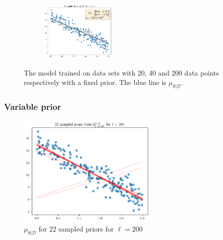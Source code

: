 \begin{figure}[H]
\begin{subfigure}{1\textwidth}
  \centering
  \includegraphics[width=0.4\textwidth]{assets/week1/fixed-prior-200-samples.png}
\end{subfigure}%
\caption{The model trained on data sets with 20, 40 and 200 data points respectively with a fixed prior. The blue line is $\mu_{\theta|\mathcal{D}}$.}
\label{fig:fixed-prior}
\end{figure}
\subsubsection{Variable prior}
\begin{figure}[H]
  \centering
  \includegraphics[width=0.6\textwidth]{assets/week1/variable-prior-fixed-samples.png}
  \caption{$\mu_{\theta | \mathcal{D}}$ for 22 sampled priors for $\ell=200$}
  \label{fig:variable-prior-fixed-samples}
\end{figure}

